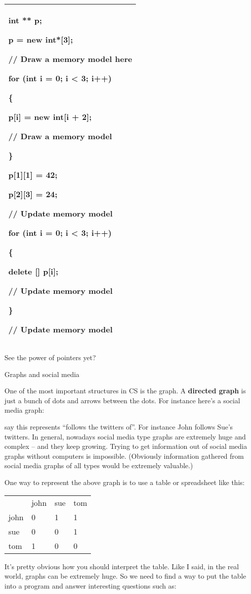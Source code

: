 \documentclass[
]{article}
\begin{document}
\begin{longtable}[]{@{}l@{}}
\toprule
\endhead
\begin{minipage}[t]{0.97\columnwidth}\raggedright
int ** p;

p = new int*{[}3{]};

// Draw a memory model here

for (int i = 0; i \textless{} 3; i++)

\{

p{[}i{]} = new int{[}i + 2{]};

// Draw a memory model

\}

p{[}1{]}{[}1{]} = 42;

p{[}2{]}{[}3{]} = 24;

// Update memory model

for (int i = 0; i \textless{} 3; i++)

\{

delete {[}{]} p{[}i{]};

// Update memory model

\}

// Update memory model\strut
\end{minipage}\tabularnewline
\bottomrule
\end{longtable}

See the power of pointers yet?

Graphs and social media

One of the most important structures in CS is the graph. A
\textbf{directed graph} is just a bunch of dots and arrows between the
dots. For instance here's a social media graph:

say this represents ``follows the twitters of''. For instance John
follows Sue's twitters. In general, nowadays social media type graphs
are extremely huge and complex -- and they keep growing. Trying to get
information out of social media graphs without computers is impossible.
(Obviously information gathered from social media graphs of all types
would be extremely valuable.)

One way to represent the above graph is to use a table or spreadsheet
like this:

\begin{longtable}[]{@{}llll@{}}
\toprule
\endhead
& john & sue & tom\tabularnewline
john & 0 & 1 & 1\tabularnewline
sue & 0 & 0 & 1\tabularnewline
tom & 1 & 0 & 0\tabularnewline
\bottomrule
\end{longtable}

It's pretty obvious how you should interpret the table. Like I said, in
the real world, graphs can be extremely huge. So we need to find a way
to put the table into a program and answer interesting questions such
as:
\end{document}
